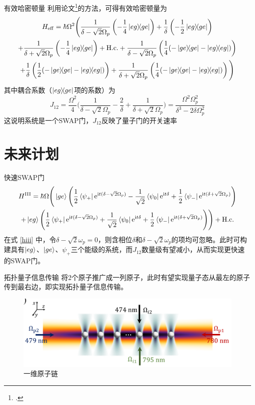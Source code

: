 \documentclass[10pt,aspectratio=43]{beamer}
\begin{document}
\begin{frame}{有效哈密顿量}
利用论文\footcite{James2007EffectiveHT}的方法，可得有效哈密顿量为
{\footnotesize\begin{multline}
H_{\mathrm{eff}}=\hbar\Omega^2\Bigg(\frac{1}{\delta-\sqrt{2}\Omega_p}\left(-\frac{1}{4}\ketbra{eg}{ge}\right)+\frac{1}{\delta}\left(-\frac{1}{2}\ketbra{eg}{ge}\right)\\
+\frac{1}{\delta+\sqrt{2}\Omega_p}\left(-\frac{1}{4}\ketbra{eg}{ge}\right)+\mathrm{H.c.}
+\frac{1}{\delta-\sqrt{2}\Omega_p}\left(\frac{1}{4}(-\ketbra{ge}{ge}-\ketbra{eg}{eg})\right)\\
+\frac{1}{\delta}\left(\frac{1}{2}(-\ketbra{ge}{ge}-\ketbra{eg}{eg})\right)
+\frac{1}{\delta+\sqrt{2}\Omega_p}\left(\frac{1}{4}(-\ketbra{ge}{ge}-\ketbra{eg}{eg})\right)\Bigg)
\end{multline}}
其中耦合系数（$ \ketbra{eg}{ge} $项的系数）为
{\small\begin{equation}
J_{12}=\frac{\Omega^2}{4}\Bigg(\frac{1}{\delta-\sqrt{2}\Omega_p}-\frac{2}{\delta}+\frac{1}{\delta+\sqrt{2}\Omega_p}\Bigg)=\frac{\Omega^2\Omega_p^2}{\delta^3-2\delta\Omega_p^2}
\end{equation}}
这说明系统是一个SWAP门，$ J_{12} $反映了量子门的开关速率
\end{frame}
\section{未来计划}
\begin{frame}{快速SWAP门}
\begin{multline*}
H^{\mathrm{III}}=\hbar\Omega\Bigg(\ket{ge}\Bigg(\frac{1}{2}\bra{\psi_+}\mathrm{e}^{\mathrm{i}t(\delta-\sqrt{2}\Omega_p)}-\frac{1}{\sqrt{2}}\bra{\psi_0}\mathrm{e}^{\mathrm{i}t \delta}+\frac{1}{2}\bra{\psi_-}\mathrm{e}^{\mathrm{i}t (\delta+\sqrt{2}\Omega_p)}\Bigg)\\
+\ket{eg}\Bigg(\frac{1}{2}\bra{\psi_+}\mathrm{e}^{\mathrm{i}t(\delta-\sqrt{2}\Omega_p)}+\frac{1}{\sqrt{2}}\bra{\psi_0}\mathrm{e}^{\mathrm{i}t \delta}+\frac{1}{2}\bra{\psi_-}\mathrm{e}^{\mathrm{i}t (\delta+\sqrt{2}\Omega_p)}\Bigg)\Bigg)+\mathrm{H.c.}
\end{multline*}
在式 \eqref{hiii} 中，令$ \delta-\sqrt{2}\omega_p=0 $，则含相位$ \delta $和$ \delta-\sqrt{2}\omega_p $的项均可忽略。此时可构建具有$ \ket{eg} $、$ \ket{ge} $、$ \psi_+ $三个能级的系统，而$ J_{12} $数量级有望减小，从而实现更快速的SWAP门。
\end{frame}
\begin{frame}{拓扑量子信息传输}
将2个原子推广成一列原子，此时有望实现量子态从最左的原子传到最右边，即实现拓扑量子信息传输。
\begin{figure}
\centering
\includegraphics[width=0.7\linewidth]{pra-energy-level-n}
\caption{一维原子链}
\label{fig:pra-energy-level-n}
\end{figure}

\end{frame}
\end{document}
